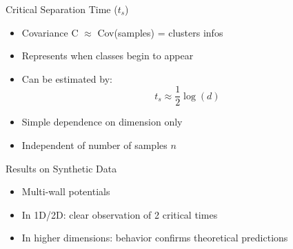 \documentclass[aspectratio=169]{beamer}
\begin{document}
\begin{frame}{Critical Separation Time ($t_s$)}
    \begin{itemize}
        \item Covariance C $\approx$ Cov(samples) = clusters infos
        \item Represents when classes begin to appear
        \item Can be estimated by:
        \begin{equation}
            t_s \approx \frac{1}{2}\log(d)
        \end{equation}
        \item Simple dependence on dimension only
        \item Independent of number of samples $n$
    \end{itemize}
    
    \begin{center}
    \end{center}
\end{frame}

\begin{frame}{Results on Synthetic Data}
    \begin{itemize}
        \item Multi-wall potentials
        \item In 1D/2D: clear observation of 2 critical times
        \item In higher dimensions: behavior confirms theoretical predictions
    \end{itemize}
    
    \begin{center}
    \end{center}
\end{frame}
\end{document}
